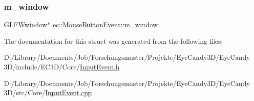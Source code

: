\mbox{\label{structec_1_1_mouse_button_event_ab83fb7bb5cd28b90c48fd6327fe45f9c}} 
\subsubsection{\texorpdfstring{m\+\_\+window}{m\_window}}
{\footnotesize\ttfamily G\+L\+F\+Wwindow$\ast$ ec\+::\+Mouse\+Button\+Event\+::m\+\_\+window}



The documentation for this struct was generated from the following files\+:\begin{DoxyCompactItemize}
\item 
D\+:/\+Library/\+Documents/\+Job/\+Forschungsmaster/\+Projekte/\+Eye\+Candy3\+D/\+Eye\+Candy3\+D/include/\+E\+C3\+D/\+Core/\mbox{\hyperlink{_input_event_8h}{Input\+Event.\+h}}\item 
D\+:/\+Library/\+Documents/\+Job/\+Forschungsmaster/\+Projekte/\+Eye\+Candy3\+D/\+Eye\+Candy3\+D/src/\+Core/\mbox{\hyperlink{_input_event_8cpp}{Input\+Event.\+cpp}}\end{DoxyCompactItemize}

